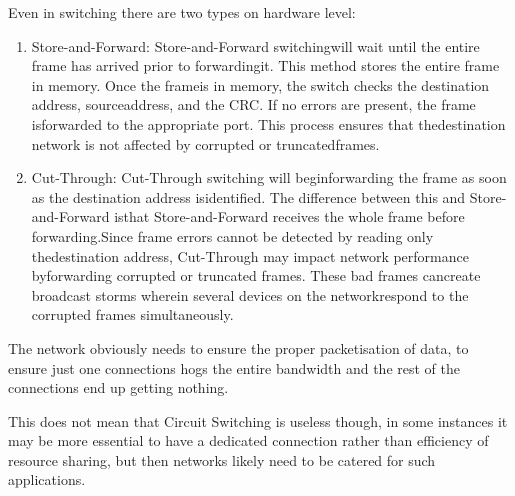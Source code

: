 \documentclass[12pt]{book}
\begin{document}
Even in switching there are two types on hardware level:
\begin{enumerate}
    \item Store-and-Forward: Store-and-Forward switchingwill wait until the entire frame has arrived prior to forwardingit. This method stores the entire frame in memory. Once the frameis in memory, the switch checks the destination address, sourceaddress, and the CRC. If no errors are present, the frame isforwarded to the appropriate port. This process ensures that thedestination network is not affected by corrupted or truncatedframes.
    \item Cut-Through: Cut-Through switching will beginforwarding the frame as soon as the destination address isidentified. The difference between this and Store-and-Forward isthat Store-and-Forward receives the whole frame before forwarding.Since frame errors cannot be detected by reading only thedestination address, Cut-Through may impact network performance byforwarding corrupted or truncated frames. These bad frames cancreate broadcast storms wherein several devices on the networkrespond to the corrupted frames simultaneously.
\end{enumerate}

The network obviously needs to ensure the proper packetisation of data, to ensure just one connections hogs the entire bandwidth and the rest of the connections end up getting nothing.

This does not mean that Circuit Switching is useless though, in some instances it may be more essential to have a dedicated connection rather than efficiency of resource sharing, but then networks likely need to be catered for such applications.
\end{document}

